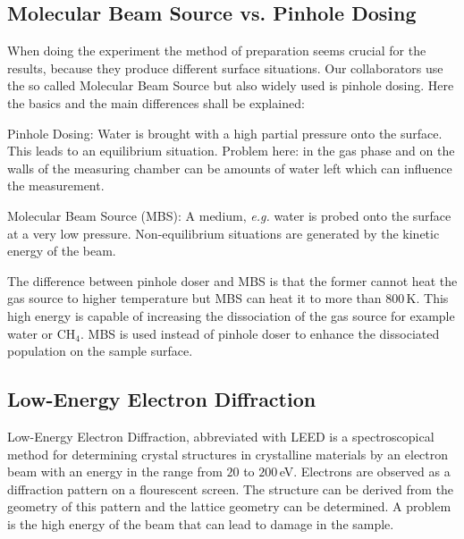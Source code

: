 \documentclass[11pt,DIV=13,BCOR=5mm,a4paper,headinclude]{scrbook}
\newcommand\todo[1]{\textcolor{red}{TODO: \textit{{#1}}}}
\begin{document}
\subsection{Molecular Beam Source vs. Pinhole Dosing}\label{mbs_vs_pd}
When doing the experiment the method of preparation seems crucial for the results, because they produce different surface situations.
Our collaborators use the so called Molecular Beam Source but also widely used is pinhole dosing.
Here the basics and the main differences shall be explained:


Pinhole Dosing: Water is brought with a high partial pressure onto the surface.
This leads to an equilibrium situation.
Problem here: in the gas phase and on the walls of the measuring chamber can be amounts of water left which can influence the measurement.


Molecular Beam Source (MBS): A medium, \textit{e.g.} water is probed onto the surface at a very low pressure.
Non-equilibrium situations are generated by the kinetic energy of the beam.


The difference between pinhole doser and MBS is that the former cannot heat the gas source to higher temperature but MBS can heat it to more than $800\,$K.
This high energy is capable of increasing the dissociation of the gas source for example water or CH$_4$.
MBS is used instead of pinhole doser to enhance the dissociated population on the sample surface.

\subsection{Low-Energy Electron Diffraction}
Low-Energy Electron Diffraction, abbreviated with LEED is a spectroscopical method for determining crystal structures in crystalline materials by an electron beam with an energy in the range from $20$ to $200\,$eV.
Electrons are observed as a diffraction pattern on a flourescent screen.
The structure can be derived from the geometry of this pattern and the lattice geometry can be determined.
A problem is the high energy of the beam that can lead to damage in the sample.
\def\thefigure{B.\arabic{figure}}
\def\thetable{B.\arabic{table}}
\end{document}
